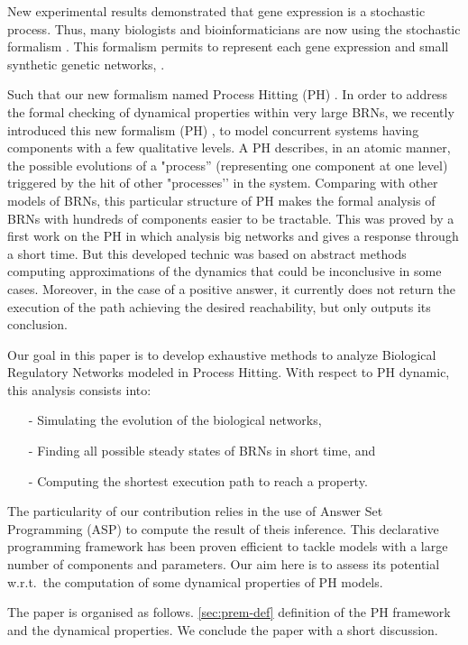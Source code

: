 New experimental results \cite{elowitz2002stochastic} \cite{blake2003noise} demonstrated that gene expression is a stochastic process. Thus, many biologists and bioinformaticians are now using the stochastic formalism \cite{arkin1998stochastic, tian2006stochastic, wang2010robust}. This formalism permits to represent each gene expression \cite{raser2005noise} and small synthetic genetic networks, \cite{elowitz2000synthetic} \cite{gardner2000construction}.

 Such that our new formalism named Process Hitting (PH) \cite{PMR10-TCSB}. In order to address the formal checking of dynamical properties within very large BRNs, we recently introduced this new formalism (PH) \cite{PMR10-TCSB}, to model concurrent systems having components with a few qualitative levels. A PH describes, in an atomic manner, the possible evolutions of a "process'' (representing one component at one level) triggered by the hit of other "processes’’ in the system. Comparing with other models of BRNs, this particular structure of PH makes the formal analysis of BRNs with hundreds of components easier to be tractable. This was proved by a first work on the PH in \cite{PMR10-TCSB,PMR12-MSCS} which analysis big networks and gives a response through a short time. But this developed technic was based on abstract methods computing approximations of the dynamics that could be inconclusive in some cases. Moreover, in the case of a positive answer, it currently does not return the execution of the path achieving the desired reachability, but only outputs its conclusion.

Our goal in this paper is to develop exhaustive methods to analyze Biological Regulatory Networks modeled in Process Hitting. With respect to PH dynamic, this analysis consists into:
\begin{itemize}
\item[-] Simulating the evolution of the biological networks,
\item[-] Finding all possible steady states of BRNs in short time, and
\item[-] Computing the shortest execution path to reach a property.
\end{itemize}

 The particularity of our contribution relies in the use of Answer Set Programming
(ASP) \cite{baral2003knowledge}
to compute the result of theis inference.
This declarative programming framework has been proven efficient
to tackle models with a large number of components and parameters.
Our aim here is to assess its potential w.r.t.\ the computation
of some dynamical properties of PH models.

The paper is organised as follows. \ref{sec:prem-def} definition of the PH framework and the dynamical properties. %
We conclude the paper with a short discussion. 
